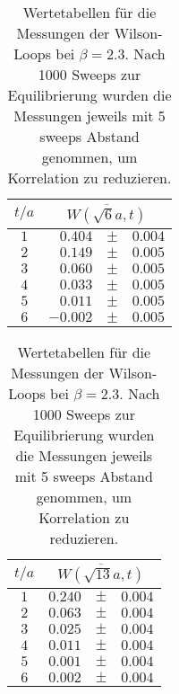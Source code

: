 \begin{table}[htbp]
\begin{tabular}{crcl} 
\hline
    $t/a$ &\multicolumn{3}{c}{$\overline{W(\sqrt{6}a,t)}$} \\ 
\hline
$1$ &	$0.404$ & 	 $\pm$ & 	 $0.004$\\
$2$ &	$0.149$ & 	 $\pm$ & 	 $0.005$\\
$3$ &	$0.060$ & 	 $\pm$ & 	 $0.005$\\
$4$ &	$0.033$ & 	 $\pm$ & 	 $0.005$\\
$5$ &	$0.011$ & 	 $\pm$ & 	 $0.005$\\
$6$ &	$-0.002$ & 	 $\pm$ & 	 $0.005$\\
\hline
\end{tabular}
    \hspace{1cm}
\begin{tabular}{crcl} 
\hline
    $t/a$ &\multicolumn{3}{c}{$\overline{W(\sqrt{13}a,t)}$} \\ 
\hline
$1$ &	$0.240$ & 	 $\pm$ & 	 $0.004$\\ 
$2$ &	$0.063$ & 	 $\pm$ & 	 $0.004$\\ 
$3$ &	$0.025$ & 	 $\pm$ & 	 $0.004$\\ 
$4$ &	$0.011$ & 	 $\pm$ & 	 $0.004$\\ 
$5$ &	$0.001$ & 	 $\pm$ & 	 $0.004$\\ 
$6$ &	$0.002$ & 	 $\pm$ & 	 $0.004$\\ 
\hline
\end{tabular}
    \caption{Wertetabellen für die Messungen der Wilson-Loops bei $\beta = 2.3$.
    Nach 1000 Sweeps zur Equilibrierung wurden die Messungen jeweils mit 5 sweeps
    Abstand genommen, um Korrelation zu reduzieren.}
    \label{tab:wilsonBeta23c}
\end{table}
